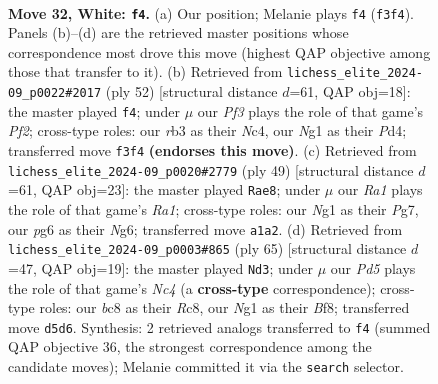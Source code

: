 \documentclass[11pt]{article}
\begin{document}
\clearpage

\begin{figure}[p]\centering
\begin{subfigure}{0.46\textwidth}\centering
\resizebox{\linewidth}{!}{%
\newchessgame
\chessboard[
  setfen={2b3k1/3n1p1p/1r4p1/3Pp3/1p2P3/1r3PP1/5K1P/R5NR w - - 6 32},
  showmover=false,
  pgfstyle=straightmove, color=movearrow, markmove={f3-f4}
]}
\caption{}
\end{subfigure}\hfill
\begin{subfigure}{0.46\textwidth}\centering
\resizebox{\linewidth}{!}{%
\newchessgame
\chessboard[
  setfen={4nk2/2p2ppp/1p3r2/pP6/P1NP3P/3K2P1/5P2/2R5 w - - 1 27},
  showmover=false,
  pgfstyle=straightmove, color=movearrow, markmove={f2-f4}
]}
\caption{}
\end{subfigure}
\\[4pt]
\begin{subfigure}{0.46\textwidth}\centering
\resizebox{\linewidth}{!}{%
\newchessgame
\chessboard[
  setfen={r5k1/5pp1/2p3np/pp2r3/8/B1P2RPP/PP3P2/3R2K1 b - - 0 25},
  showmover=false,
  pgfstyle=straightmove, color=movearrow, markmove={a8-e8}
]}
\caption{}
\end{subfigure}\hfill
\begin{subfigure}{0.46\textwidth}\centering
\resizebox{\linewidth}{!}{%
\newchessgame
\chessboard[
  setfen={2r2bk1/R2p3p/4p1p1/1Nn5/2P2P2/2P1p1PP/P6K/5R2 b - - 0 33},
  showmover=false,
  pgfstyle=straightmove, color=movearrow, markmove={c5-d3}
]}
\caption{}
\end{subfigure}
\caption{\textbf{Move 32, White: \texttt{f4}.} (a) Our position; Melanie plays \texttt{f4} (\texttt{f3f4}). Panels (b)--(d) are the retrieved master positions whose correspondence most drove this move (highest QAP objective among those that transfer to it). (b) Retrieved from \texttt{lichess\_elite\_2024-09\_p0022\#2017} (ply 52) [structural distance $d$=61, QAP obj=18]: the master played \texttt{f4}; under $\mu$ our \emph{Pf3} plays the role of that game's \emph{Pf2}; cross-type roles: our \emph{r}b3 as their \emph{N}c4, our \emph{N}g1 as their \emph{P}d4; transferred move \texttt{f3f4} \textbf{(endorses this move)}. (c) Retrieved from \texttt{lichess\_elite\_2024-09\_p0020\#2779} (ply 49) [structural distance $d$=61, QAP obj=23]: the master played \texttt{Rae8}; under $\mu$ our \emph{Ra1} plays the role of that game's \emph{Ra1}; cross-type roles: our \emph{N}g1 as their \emph{P}g7, our \emph{p}g6 as their \emph{N}g6; transferred move \texttt{a1a2}. (d) Retrieved from \texttt{lichess\_elite\_2024-09\_p0003\#865} (ply 65) [structural distance $d$=47, QAP obj=19]: the master played \texttt{Nd3}; under $\mu$ our \emph{Pd5} plays the role of that game's \emph{Nc4} (a \textbf{cross-type} correspondence); cross-type roles: our \emph{b}c8 as their \emph{R}c8, our \emph{N}g1 as their \emph{B}f8; transferred move \texttt{d5d6}. Synthesis: 2 retrieved analogs transferred to \texttt{f4} (summed QAP objective 36, the strongest correspondence among the candidate moves); Melanie committed it via the \texttt{search} selector.}
\label{fig:thought-m62}
\end{figure}
\end{document}
